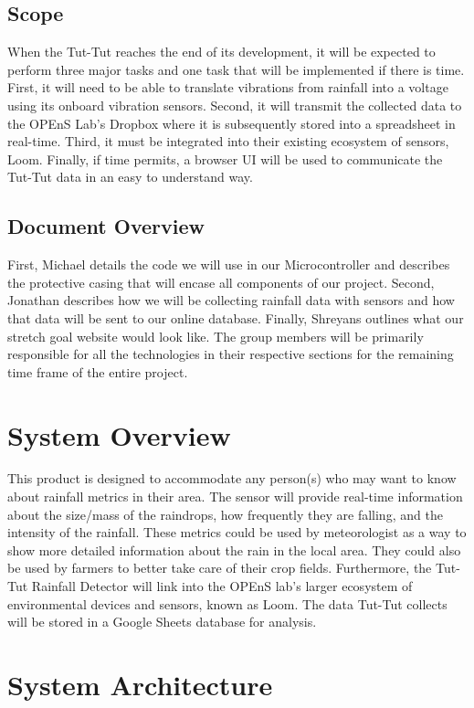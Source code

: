 \documentclass[letterpaper,10pt,draftclsnofoot,onecolumn]{article}
\begin{document}
\subsection{Scope}
When the Tut-Tut reaches the end of its development, it will be expected to perform three major tasks and one task that will be implemented if there is time. First, it will need to be able to translate vibrations from rainfall into a voltage using its onboard vibration sensors. Second, it will transmit the collected data to the OPEnS Lab's Dropbox where it is subsequently stored into a spreadsheet in real-time. Third, it must be integrated into their existing ecosystem of sensors, Loom. Finally, if time permits, a browser UI will be used to communicate the Tut-Tut data in an easy to understand way.

\subsection{Document Overview}
First, Michael details the code we will use in our Microcontroller and describes the protective casing that will encase all components of our project. Second, Jonathan describes how we will be collecting rainfall data with sensors and how that data will be sent to our online database. Finally, Shreyans outlines what our stretch goal website would look like. The group members will be primarily responsible for all the technologies in their respective sections for the remaining time frame of the entire project.

\section{System Overview}
This product is designed to accommodate any person(s) who may want to know about rainfall metrics in their area. The sensor will provide real-time information about the size/mass of the raindrops, how frequently they are falling, and the intensity of the rainfall. These metrics could be used by meteorologist as a way to show more detailed information about the rain in the local area. They could also be used by farmers to better take care of their crop fields. Furthermore, the Tut-Tut Rainfall Detector will link into the OPEnS lab's larger ecosystem of environmental devices and sensors, known as Loom. The data Tut-Tut collects will be stored in a Google Sheets database for analysis.

\section{System Architecture}
\end{document}
